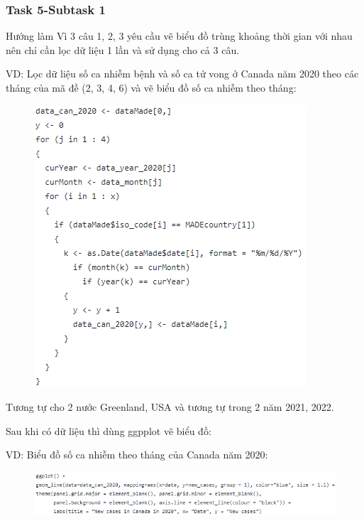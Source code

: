 \documentclass[english,10pt,table]{beamer}
\begin{document}
\frame
{
    \frametitle{Task 5-Subtask 1}
    \begin{block}{Hướng làm}
        Vì 3 câu 1, 2, 3 yêu cầu vẽ biểu đồ trùng khoảng thời gian với nhau nên chỉ cần lọc dữ liệu 1 lần và sử dụng cho cả 3 câu.
	
	VD: Lọc dữ liệu số ca nhiễm bệnh và số ca tử vong ở Canada năm 2020 theo các tháng của mã đề (2, 3, 4, 6) và vẽ biểu đồ số ca nhiễm theo tháng:
	            \begin{figure}[H]
				    \centering
				    \includegraphics[scale=0.2]{images/5.0.2.png}
		    	\end{figure}
    Tương tự cho 2 nước Greenland, USA và tương tự trong 2 năm 2021, 2022.
    
    Sau khi có dữ liệu thì dùng ggpplot vẽ biểu đồ:
    
    VD: Biểu đồ số ca nhiễm theo tháng của Canada năm 2020:
                \begin{figure}[H]
				    \centering
				    \includegraphics[scale=0.2]{images/5.0.3.png}
		    	\end{figure}
    \end{block}
}
\frame
\end{document}
